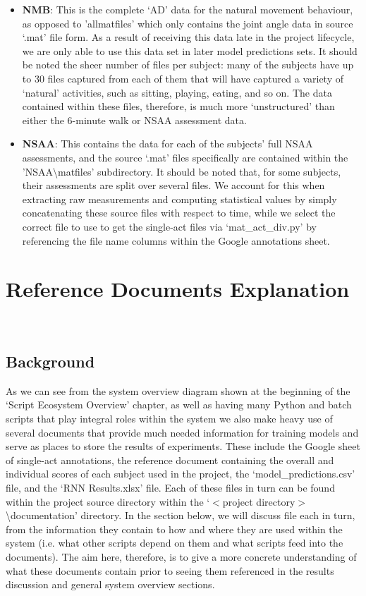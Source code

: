 \documentclass[12pt,twoside]{report}
\begin{document}
\begin{itemize}
	\item \textbf{NMB}: This is the complete ‘AD’ data for the natural movement behaviour, as opposed to 'allmatfiles' which only contains the joint angle data in source ‘.mat’ file form. As a result of receiving this data late in the project lifecycle, we are only able to use this data set in later model predictions sets. It should be noted the sheer number of files per subject: many of the subjects have up to 30 files captured from each of them that will have captured a variety of ‘natural’ activities, such as sitting, playing, eating, and so on. The data contained within these files, therefore, is much more ‘unstructured’ than either the 6-minute walk or NSAA assessment data.
	\item \textbf{NSAA}: This contains the data for each of the subjects’ full NSAA assessments, and the source ‘.mat’ files specifically are contained within the 'NSAA\textbackslash matfiles' subdirectory. It should be noted that, for some subjects, their assessments are split over several files. We account for this when extracting raw measurements and computing statistical values by simply concatenating these source files with respect to time, while we select the correct file to use to get the single-act files via ‘mat\_act\_div.py’ by referencing the file name columns within the Google annotations sheet.
\end{itemize}




\chapter{Reference Documents Explanation\\~\\}

\section{Background}

\quad As we can see from the system overview diagram shown at the beginning of the ‘Script Ecosystem Overview’ chapter, as well as having many Python and batch scripts that play integral roles within the system we also make heavy use of several documents that provide much needed information for training models and serve as places to store the results of experiments. These include the Google sheet of single-act annotations, the reference document containing the overall and individual scores of each subject used in the project, the ‘model\_predictions.csv’ file, and the ‘RNN Results.xlsx’ file. Each of these files in turn can be found within the project source directory within the ‘$<$project directory$>$\textbackslash documentation’ directory. In the section below, we will discuss file each in turn, from the information they contain to how and where they are used within the system (i.e. what other scripts depend on them and what scripts feed into the documents). The aim here, therefore, is to give a more concrete understanding of what these documents contain prior to seeing them referenced in the results discussion and general system overview sections.
\end{document}
